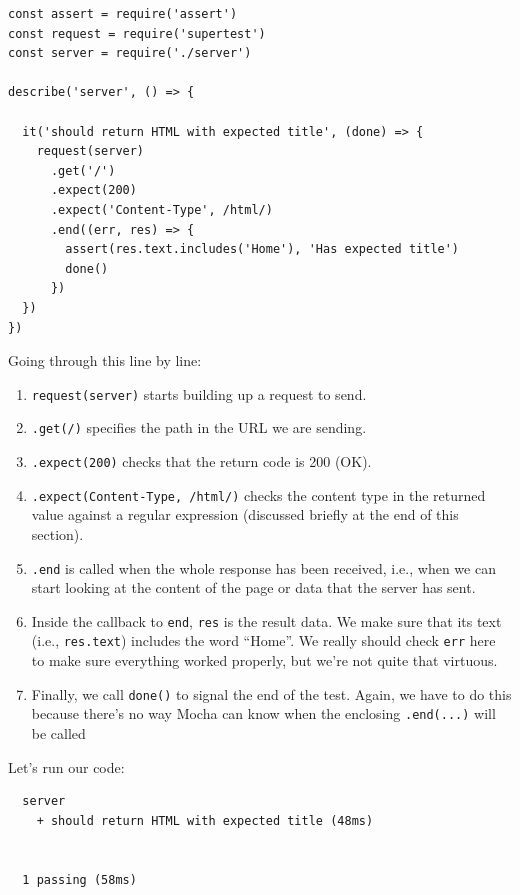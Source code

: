 \begin{verbatim}
const assert = require('assert')
const request = require('supertest')
const server = require('./server')

describe('server', () => {

  it('should return HTML with expected title', (done) => {
    request(server)
      .get('/')
      .expect(200)
      .expect('Content-Type', /html/)
      .end((err, res) => {
        assert(res.text.includes('Home'), 'Has expected title')
        done()
      })
  })
})
\end{verbatim}

Going through this line by line:

\begin{enumerate}
\tightlist
\item
  \texttt{request(server)} starts building up a request to send.
\item
  \texttt{.get(\textquotesingle{}/\textquotesingle{})} specifies the
  path in the URL we are sending.
\item
  \texttt{.expect(200)} checks that the return code is 200 (OK).
\item
  \texttt{.expect(\textquotesingle{}Content-Type\textquotesingle{},\ /html/)}
  checks the content type in the returned value against a regular
  expression (discussed briefly at the end of this section).
\item
  \texttt{.end} is called when the whole response has been received,
  i.e., when we can start looking at the content of the page or data
  that the server has sent.
\item
  Inside the callback to \texttt{end}, \texttt{res} is the result data.
  We make sure that its text (i.e., \texttt{res.text}) includes the word
  ``Home''. We really should check \texttt{err} here to make sure
  everything worked properly, but we're not quite that virtuous.
\item
  Finally, we call \texttt{done()} to signal the end of the test. Again,
  we have to do this because there's no way Mocha can know when the
  enclosing \texttt{.end(...)} will be called
\end{enumerate}

Let's run our code:

\begin{verbatim}
  server
    + should return HTML with expected title (48ms)


  1 passing (58ms)
\end{verbatim}

